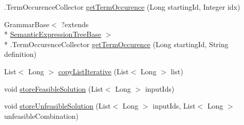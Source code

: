 \begin{DoxyCompactItemize}
.Term\-Occurence\-Collector \hyperlink{classit_1_1emarolab_1_1cagg_1_1core_1_1evaluation_1_1inputFormatting_1_1ThreadedInputFormatter_1_1FactsSearcher_aeb980680badca2ec3ea201ae37c66e55}{get\-Term\-Occurence} (Long starting\-Id, Integer idx)
\item 
Grammar\-Base$<$ ?extends \\*
\hyperlink{interfaceit_1_1emarolab_1_1cagg_1_1core_1_1evaluation_1_1semanticGrammar_1_1syntaxCompiler_1_1SemanticExpressionTreeBase}{Semantic\-Expression\-Tree\-Base} $>$\\*
.Term\-Occurence\-Collector \hyperlink{classit_1_1emarolab_1_1cagg_1_1core_1_1evaluation_1_1inputFormatting_1_1ThreadedInputFormatter_1_1FactsSearcher_a194328fc00ac7b069703ccf6067d4448}{get\-Term\-Occurence} (Long starting\-Id, String definition)
\item 
List$<$ Long $>$ \hyperlink{classit_1_1emarolab_1_1cagg_1_1core_1_1evaluation_1_1inputFormatting_1_1ThreadedInputFormatter_1_1FactsSearcher_a61b12e8965690d5b3cb413d6c7e4e98e}{copy\-List\-Iterative} (List$<$ Long $>$ list)
\item 
void \hyperlink{classit_1_1emarolab_1_1cagg_1_1core_1_1evaluation_1_1inputFormatting_1_1ThreadedInputFormatter_1_1FactsSearcher_abd2a610b01c1c20202f9e74b258e9302}{store\-Feasible\-Solution} (List$<$ Long $>$ input\-Ids)
\item 
void \hyperlink{classit_1_1emarolab_1_1cagg_1_1core_1_1evaluation_1_1inputFormatting_1_1ThreadedInputFormatter_1_1FactsSearcher_a3de0f5f5240caa4133aebd0c61a5b0a9}{store\-Unfeasible\-Solution} (List$<$ Long $>$ input\-Ids, List$<$ Long $>$ unfeasible\-Combination)
\end{DoxyCompactItemize}
